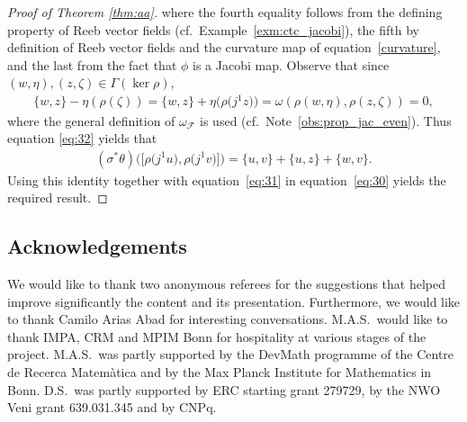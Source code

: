 \documentclass[10pt,a4paper]{amsart}
\numberwithin{equation}{section}
\begin{document}
\begin{proof}[Proof of Theorem \ref{thm:aa}]
where the fourth equality follows from the def\/ining property of Reeb vector f\/ields (cf.\ Example~\ref{exm:ctc_jacobi}), the f\/ifth by def\/inition of Reeb vector f\/ields and the curvature map of equation~\eqref{curvature}, and the last from the fact that $\phi$ is a Jacobi map. Observe that since $(w,\eta),(z,\zeta) \in \Gamma(\ker \rho)$,
\begin{gather*}
 \{w,z\} - \eta (\rho(\zeta)) = \{w,z\} + \eta\big(\rho\big(j^1z\big)\big) = \omega (\rho(w,\eta),\rho(z,\zeta)) = 0,
\end{gather*}
where the general def\/inition of $\omega_{\mathcal{F}}$ is used (cf.\ Note~\ref{obs:prop_jac_even}). Thus equation \eqref{eq:32} yields that
\begin{gather*}
(\sigma^*\theta)\big(\big[\rho\big(j^1u\big), \rho\big(j^1v\big)\big]\big) = \{u,v\} + \{u,z\} + \{w,v\}.
\end{gather*}
Using  this identity together with equation~\eqref{eq:31} in equation~\eqref{eq:30} yields the required result.
\end{proof}

\subsection*{Acknowledgements}
We would like to thank two anonymous referees for the suggestions that helped improve signif\/icantly the content and its presentation. Furthermore, we would like to thank Camilo Arias Abad for interesting conversations. M.A.S.\ would like to thank IMPA, CRM and MPIM Bonn for hospitality at various stages of the project. M.A.S.\ was partly supported by the DevMath programme of the Centre de Recerca Matem\`atica and by the Max Planck Institute for Mathematics in Bonn. D.S.\ was partly supported by ERC starting grant 279729, by the NWO Veni grant 639.031.345 and by CNPq.

\end{document}
